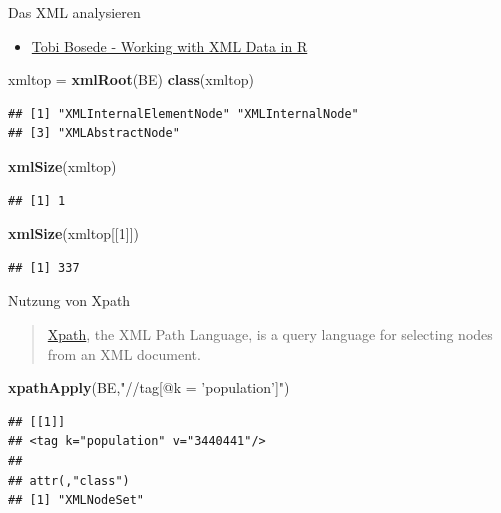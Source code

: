 \documentclass[ignorenonframetext,]{beamer}
\newenvironment{Shaded}{\begin{snugshade}}{\end{snugshade}}
\newcommand{\DecValTok}[1]{\textcolor[rgb]{0.27,0.67,0.26}{#1}}
\newcommand{\KeywordTok}[1]{\textcolor[rgb]{0.26,0.66,0.93}{\textbf{#1}}}
\newcommand{\NormalTok}[1]{\textcolor[rgb]{0.74,0.68,0.62}{#1}}
\newcommand{\StringTok}[1]{\textcolor[rgb]{0.02,0.61,0.04}{#1}}
\providecommand{\tightlist}{%
  \setlength{\itemsep}{0pt}\setlength{\parskip}{0pt}}
\begin{document}
\begin{frame}[fragile]{Das XML analysieren}
\protect\hypertarget{das-xml-analysieren}{}

\begin{itemize}[<+->]
\tightlist
\item
  \href{http://www.informit.com/articles/article.aspx?p=2215520}{Tobi
  Bosede - Working with XML Data in R}
\end{itemize}

\begin{Shaded}
\begin{Highlighting}[]
\NormalTok{xmltop =}\StringTok{ }\KeywordTok{xmlRoot}\NormalTok{(BE)}
\KeywordTok{class}\NormalTok{(xmltop)}
\end{Highlighting}
\end{Shaded}

\begin{verbatim}
## [1] "XMLInternalElementNode" "XMLInternalNode"       
## [3] "XMLAbstractNode"
\end{verbatim}

\begin{Shaded}
\begin{Highlighting}[]
\KeywordTok{xmlSize}\NormalTok{(xmltop)}
\end{Highlighting}
\end{Shaded}

\begin{verbatim}
## [1] 1
\end{verbatim}

\begin{Shaded}
\begin{Highlighting}[]
\KeywordTok{xmlSize}\NormalTok{(xmltop[[}\DecValTok{1}\NormalTok{]])}
\end{Highlighting}
\end{Shaded}

\begin{verbatim}
## [1] 337
\end{verbatim}

\end{frame}

\begin{frame}[fragile]{Nutzung von Xpath}
\protect\hypertarget{nutzung-von-xpath}{}

\begin{quote}
\href{https://de.wikipedia.org/wiki/XPath}{Xpath}, the XML Path
Language, is a query language for selecting nodes from an XML document.
\end{quote}

\begin{Shaded}
\begin{Highlighting}[]
\KeywordTok{xpathApply}\NormalTok{(BE,}\StringTok{"//tag[@k = 'population']"}\NormalTok{)}
\end{Highlighting}
\end{Shaded}

\begin{verbatim}
## [[1]]
## <tag k="population" v="3440441"/> 
## 
## attr(,"class")
## [1] "XMLNodeSet"
\end{verbatim}

\end{frame}
\end{document}
